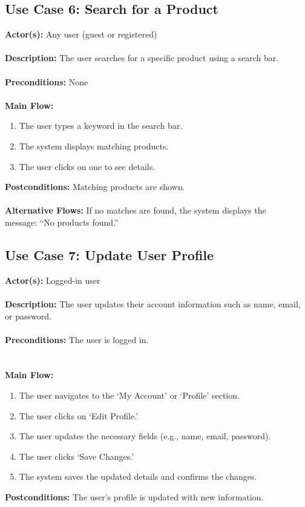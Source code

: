 \documentclass[a4paper,12pt]{article}
\begin{document}
	\subsection*{Use Case 6: Search for a Product}
	\textbf{Actor(s):} Any user (guest or registered) \\ \\
	\textbf{Description:} The user searches for a specific product using a search bar. \\ \\
	\textbf{Preconditions:} None \\ \\
	\textbf{Main Flow:}
	\begin{enumerate}
  		\item The user types a keyword in the search bar.
  		\item The system displays matching products.
  		\item The user clicks on one to see details.
	\end{enumerate}
	\textbf{Postconditions:} Matching products are shown. \\ \\
	\textbf{Alternative Flows:} If no matches are found, the system displays the \\ message: ``No products
	found.''

	\subsection*{Use Case 7: Update User Profile}
	\textbf{Actor(s):} Logged-in user \\ \\
	\textbf{Description:} The user updates their account information such as name, email, or password. \\ \\
	\textbf{Preconditions:} The user is logged in. \\ \\ \\
	\textbf{Main Flow:}
	\begin{enumerate}
	\item The user navigates to the `My Account' or `Profile' section.
	\item The user clicks on `Edit Profile.'
	\item The user updates the necessary fields (e.g., name, email, password).
	\item The user clicks `Save Changes.'
	\item The system saves the updated details and confirms the changes.
	\end{enumerate}
	\textbf{Postconditions:} The user's profile is updated with new information.
\end{document}
